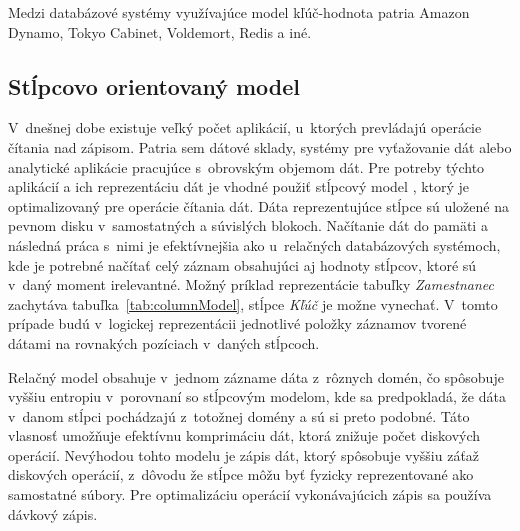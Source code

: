 \documentclass[11pt,twoside,a4paper]{book}
\begin{document}
Medzi databázové systémy využívajúce model kľúč-hodnota patria Amazon Dynamo, Tokyo Cabinet, Voldemort, Redis a iné.

\subsection{Stĺpcovo orientovaný model}


V~dnešnej dobe existuje veľký počet aplikácií, u~ktorých prevládajú operácie čítania nad zápisom. Patria sem dátové sklady, systémy pre vyťažovanie dát alebo analytické aplikácie pracujúce s~obrovským objemom dát. Pre potreby týchto aplikácií a ich reprezentáciu dát je vhodné použiť stĺpcový model \cite{abadi2009column, abadi2009}, ktorý je optimalizovaný pre operácie čítania dát. Dáta reprezentujúce stĺpce sú uložené na pevnom disku v~samostatných a súvislých blokoch. Načítanie dát do pamäti a následná práca s~nimi je efektívnejšia ako u~relačných databázových systémoch, kde je potrebné načítať celý záznam obsahujúci aj hodnoty stĺpcov, ktoré sú v~daný moment irelevantné. Možný príklad reprezentácie tabuľky \emph{Zamestnanec} zachytáva tabuľka~\ref{tab:columnModel}, stĺpce \emph{Kľúč} je možne vynechať. V~tomto prípade budú v~logickej reprezentácii jednotlivé položky záznamov tvorené dátami na rovnakých pozíciach v~daných stĺpcoch.

Relačný model obsahuje v~jednom zázname dáta z~rôznych domén, čo spôsobuje vyššiu entropiu v~porovnaní so stĺpcovým modelom, kde sa predpokladá, že dáta v~danom stĺpci pochádzajú z~totožnej domény a sú si preto podobné. Táto vlasnosť umožňuje efektívnu komprimáciu dát, ktorá znižuje počet diskových operácií. Nevýhodou tohto modelu je zápis dát, ktorý spôsobuje vyššiu záťaž diskových operácií, z~dôvodu že stĺpce môžu byť fyzicky reprezentované ako samostatné súbory. Pre optimalizáciu operácií vykonávajúcich zápis sa používa dávkový zápis.

\end{document}
